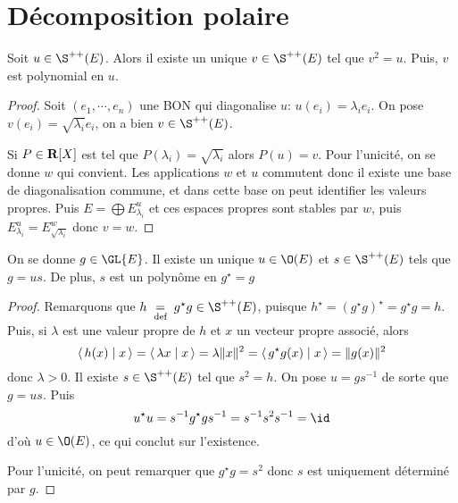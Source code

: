 
\section{Décomposition polaire}

\begin{prop}
    Soit $u \in  \S^{++}(E)$. Alors il existe un unique $v \in  \S ^{++}(E)$ tel que $v^2 =u$. Puis, $v$ est polynomial en  $u$.
\end{prop}

\begin{proof}
    Soit $(e_1, \cdots , e_n)$ une BON qui diagonalise $u$:  $ u(e_i)=\lambda_i e_i$. On pose $v(e_i)=\sqrt{\lambda_i}e_i$, on a bien  $v \in  \S ^{++}(E)$.

    Si $P \in  \mathbf R[X]$ est tel que $P(\lambda_i)=\sqrt{\lambda_i}$ alors  $P(u)=v$. Pour l'unicité, on se donne  $w$ qui convient. Les applications  $w$ et  $u$ commutent donc il existe une base de diagonalisation commune, et dans cette base on peut identifier les valeurs propres. Puis  $E=\bigoplus E_{\lambda_i}^u$ et  ces espaces propres sont stables par  $w$, puis  $E_{\lambda_i}^u=E_{\sqrt{\lambda_i}}^w$ donc  $v=w$.
\end{proof}

\begin{thm}
    On se donne $g \in  \GL{E}$. Il existe un unique $u \in  \O(E)$ et $s \in  \S ^{++}(E)$ tels que $g=us$. De plus,  $s$ est un polynôme en  $g^\star=g$
\end{thm}

\begin{proof}
    Remarquons que $h\defeq g^\star g \in  \S ^{++}(E)$, puisque $h^\star=(g^\star g)^\star=g^\star g=h$. Puis, si  $\lambda$ est une valeur propre de  $h$ et  $x$ un vecteur propre associé, alors  \[
        \scalar{h(x)}{x} = \scalar{\lambda x}{x} = \lambda \|x\|^2 = \scalar{g^\star g (x)}{x} = \|g(x)\|^2 
    \] 
    donc $ \lambda >0$. Il existe $s \in \S^{ ++ }(E)$ tel que $s^2 =h$. On pose $u=gs^{-1}$ de sorte que $g=us$. Puis  \[
    u^\star u=s^{-1}g^\star g s^{-1}=s ^{-1} s^2 s ^{-1}=\id
    \] 
    d'où $u \in  \O(E)$, ce qui conclut sur l'existence.

    Pour l'unicité, on peut remarquer que $g^\star g=s^2$ donc  $s$ est uniquement déterminé par  $g$.
\end{proof}
